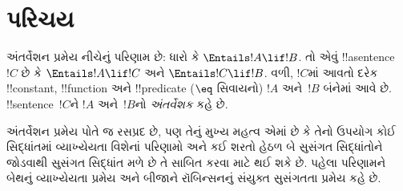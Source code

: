 \documentclass[../../../include/open-logic-section]{subfiles}
\begin{document}

\section{પરિચય}

અંતર્વેશન પ્રમેય નીચેનું પરિણામ છે: ધારો કે
$\Entails !A \lif !B$. તો એવું !!a{sentence}~$!C$ છે કે
$\Entails !A \lif !C$ અને $\Entails !C \lif !B$. વળી, $!C$માં આવતો
દરેક !!{constant}, !!{function} અને !!{predicate} ($\eq$ સિવાયનો)
$!A$ અને~$!B$ બંનેમાં આવે છે. !!{sentence}~$!C$ને $!A$ અને~$!B$નો
\emph{અંતર્વેશક} કહે છે.

અંતર્વેશન પ્રમેય પોતે જ રસપ્રદ છે, પણ તેનું મુખ્ય મહત્વ એમાં છે કે
તેનો ઉપયોગ કોઈ સિદ્ધાંતમાં વ્યાખ્યેયતા વિશેનાં પરિણામો અને કઈ
શરતો હેઠળ બે સુસંગત સિદ્ધાંતોને જોડવાથી સુસંગત સિદ્ધાંત મળે છે તે
સાબિત કરવા માટે થઈ શકે છે. પહેલા પરિણામને બેથનું વ્યાખ્યેયતા પ્રમેય
અને બીજાને રૉબિન્સનનું સંયુક્ત સુસંગતતા પ્રમેય કહે છે.
\end{document}
